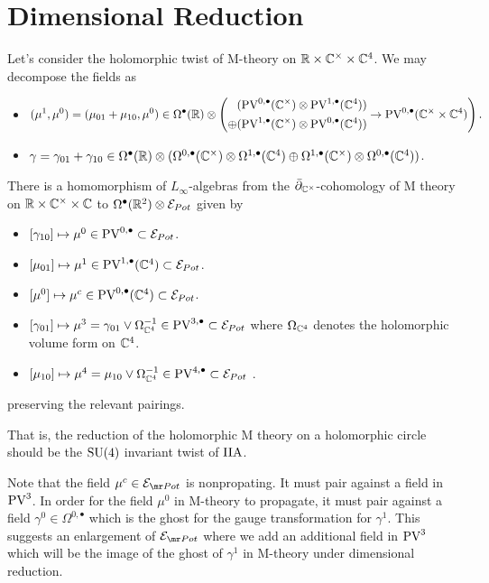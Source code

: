 \documentclass[11pt]{article}
\begin{document}
\section{Dimensional Reduction}
Let's consider the holomorphic twist of M-theory on $\mathbb{R}\times\mathbb{C}^\times\times\mathbb{C}^4$. We may decompose the fields as
\begin{itemize}
\item \[(\mu^{1}, \mu^{0})=(\mu_{01}+\mu_{10}, \mu^{0})\in\Omega^\bullet(\mathbb{R})\otimes\left (\begin{aligned} &( \text{PV}^{0,\bullet}(\mathbb{C}^\times)\otimes\text{PV}^{1,\bullet}(\mathbb{C}^4)) \\ \oplus & (\text{PV}^{1,\bullet}(\mathbb{C}^\times)\otimes\text{PV}^{0,\bullet}(\mathbb{C}^4))\end{aligned} \to\text{PV}^{0,\bullet}(\mathbb{C}^\times\times\mathbb{C}^4)\right ).\]
\item $\gamma=\gamma_{01}+\gamma_{10}\in \Omega^\bullet(\mathbb{R})\otimes(\Omega^{0,\bullet}(\mathbb{C}^\times)\otimes\Omega^{1,\bullet}(\mathbb{C}^4)\oplus\Omega^{1,\bullet}(\mathbb{C}^\times)\otimes\Omega^{0,\bullet}(\mathbb{C}^4))$.
\end{itemize}

\begin{prop}
There is a homomorphism of $L_\infty$-algebras from the $\bar{\partial}_{\mathbb{C}^\times}$-cohomology of M theory on $\mathbb{R}\times\mathbb{C}^\times\times\mathbb{C}$ to $\Omega^\bullet(\mathbb{R}^2)\otimes\mathcal{E}_{Pot}$ given by
\begin{itemize}
\item $[\gamma_{10}]\mapsto\mu^0\in\text{PV}^{0,\bullet}\subset\mathcal{E}_{Pot}$.
  \item $[\mu_{01}]\mapsto\mu^1\in\text{PV}^{1,\bullet}(\mathbb{C}^4)\subset\mathcal{E}_{Pot}$.
\item $[\mu^{0}]\mapsto\mu^{c}\in\text{PV}^{0, \bullet}(\mathbb{C}^{4})\subset\mathcal{E}_{Pot}$.
\item $[\gamma_{01}]\mapsto\mu^3 = \gamma_{01}\vee\Omega^{-1}_{\mathbb{C}^4}\in\text{PV}^{3,\bullet}\subset\mathcal{E}_{Pot}$ where $\Omega_{\mathbb{C}^4}$ denotes the holomorphic volume form on $\mathbb{C}^4$.
\item $[\mu_{10}]\mapsto\mu^4 =\mu_{10}\vee\Omega^{-1}_{\mathbb{C}^4}\in\text{PV}^{4,\bullet}\subset\mathcal{E}_{Pot}$ .


\end{itemize}
preserving the relevant pairings.
\end{prop}

That is, the reduction of the holomorphic M theory on a holomorphic circle should be the $\text{SU}(4)$ invariant twist of $\text{IIA}$.

\begin{rmk}
Note that the field $\mu^{c}\in \mc E_{\mr Pot}$ is nonpropating. It must pair against a field in $\text{PV}^{3}$. In order for the field $\mu^{0}$ in M-theory to propagate, it must pair against a field $\gamma^{0}\in \Omega^{0,\bullet}$ which is the ghost for the gauge transformation for $\gamma^{1}$. This suggests an enlargement of $\mc E_{\mr Pot}$ where we add an additional field in $\text{PV}^{3}$ which will be the image of the ghost of $\gamma^{1}$ in M-theory under dimensional reduction.
\end{rmk}
\end{document}
